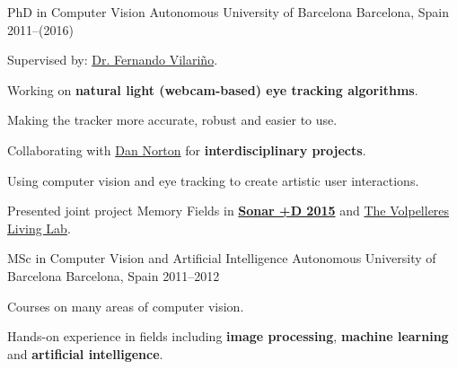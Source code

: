 

\begin{cventries}

  \cventry
    {PhD in Computer Vision} %
    {Autonomous University of Barcelona} %
    {Barcelona, Spain} %
    {2011--(2016)} %
    {
      \begin{cvitems} %
        \item {Supervised by: \href{http://vi.cvc.uab.es/fernando-vilarino}{Dr. Fernando Vilari\~no}.}
        \item {Working on \textbf{natural light (webcam-based) eye tracking algorithms}.}
        \item {Making the tracker more accurate, robust and easier to use.}
        \item {Collaborating with \href{http://ablab.org}{Dan Norton} for \textbf{interdisciplinary projects}.}
        \item {Using computer vision and eye tracking to create artistic user interactions.}
        \item {Presented joint project Memory Fields in \textbf{\href{http://sonarplusd.com/}{Sonar +D 2015}} and \href{http://l3.cvc.uab.es/}{The Volpelleres Living Lab}.}
      \end{cvitems}
    }

  \cventry
    {MSc in Computer Vision and Artificial Intelligence} %
    {Autonomous University of Barcelona} %
    {Barcelona, Spain} %
    {2011--2012} %
    {
      \begin{cvitems} %
        \item {Courses on many areas of computer vision.}
        \item {Hands-on experience in fields including \textbf{image processing}, \textbf{machine learning} and \textbf{artificial intelligence}.}
      \end{cvitems}
    }


\end{cventries}
